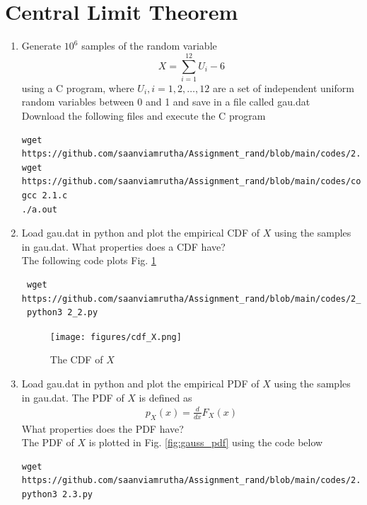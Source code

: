 \documentclass[journal,12pt,twocolumn]{IEEEtran}
\renewcommand\thesection{\arabic{section}}
\begin{document}
\section{Central Limit Theorem}
%
\begin{enumerate}[label=\thesection.\arabic*
,ref=\thesection.\theenumi]
%
\item
Generate $10^6$ samples of the random variable
%
\begin{equation}
X = \sum_{i=1}^{12}U_i -6
\end{equation}
%
using a C program, where $U_i, i = 1,2,\dots, 12$ are  a set of independent uniform random variables between 0 and 1
and save in a file called gau.dat
\\
\solution 
Download the following files and execute the C program
\begin{lstlisting}
wget https://github.com/saanviamrutha/Assignment_rand/blob/main/codes/2.1.c
wget https://github.com/saanviamrutha/Assignment_rand/blob/main/codes/coeffs.h
gcc 2.1.c
./a.out
\end{lstlisting}
\item
Load gau.dat in python and plot the empirical CDF of $X$ using the samples in gau.dat. What properties does a CDF have?
\\
\solution The following code plots Fig. \ref{fig:gauss_cdf}
\begin{lstlisting}
 wget https://github.com/saanviamrutha/Assignment_rand/blob/main/codes/2_2.py
 python3 2_2.py
\end{lstlisting}
\begin{figure}
\centering
\texttt{[image: figures/cdf\_X.png]}
\caption{The CDF of $X$}
\label{fig:gauss_cdf}
\end{figure}
\item
Load gau.dat in python and plot the empirical PDF of $X$ using the samples in gau.dat. The PDF of $X$ is defined as
\begin{align}
p_{X}(x) = \frac{d}{dx}F_{X}(x)
\end{align}
What properties does the PDF have?
\\
\solution The PDF of $X$ is plotted in Fig. \ref{fig:gauss_pdf} using the code below
\begin{lstlisting}
wget https://github.com/saanviamrutha/Assignment_rand/blob/main/codes/2.3.py
python3 2.3.py
\end{lstlisting}
\begin{figure}
\centering

\end{figure}
\end{enumerate}
\end{document}
